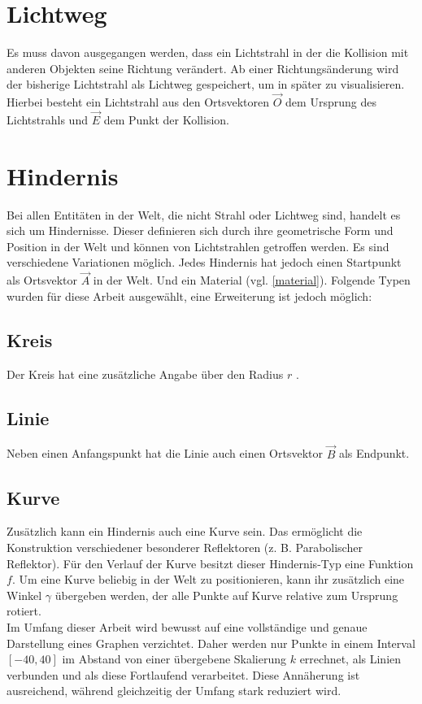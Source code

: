 \section{Lichtweg}
Es muss davon ausgegangen werden, dass ein Lichtstrahl in der 
die Kollision mit anderen Objekten seine Richtung verändert. 
Ab einer Richtungsänderung wird der bisherige Lichtstrahl als Lichtweg  
gespeichert, um in später zu visualisieren.
Hierbei besteht ein Lichtstrahl aus den Ortsvektoren $ \vec{O} $  dem 
Ursprung des Lichtstrahls und $ \vec{E} $  dem Punkt der Kollision.

\section{Hindernis}
Bei allen Entitäten in der Welt, die nicht Strahl oder Lichtweg sind, 
handelt es sich um Hindernisse. 
Dieser definieren sich durch ihre geometrische Form und Position in der Welt 
und können von Lichtstrahlen getroffen werden.
Es sind verschiedene Variationen möglich. Jedes Hindernis  
hat jedoch einen Startpunkt als Ortsvektor $ \vec{A} $  in der Welt. 
Und ein Material  (vgl. \ref{material}). 
Folgende Typen wurden für diese Arbeit ausgewählt, eine Erweiterung ist jedoch möglich: 

\subsection{Kreis}
Der Kreis  hat eine zusätzliche Angabe über den Radius $ r $ .

\subsection{Linie}
Neben einen Anfangspunkt hat die Linie  auch einen Ortsvektor $ \vec{B} $ als Endpunkt. 

\subsection{Kurve}
Zusätzlich kann ein Hindernis auch eine Kurve  sein. 
Das ermöglicht die Konstruktion verschiedener besonderer Reflektoren (z. B. Parabolischer Reflektor).
Für den Verlauf der Kurve besitzt dieser Hindernis-Typ eine Funktion $ f $. 
Um eine Kurve beliebig in der Welt zu positionieren, kann ihr zusätzlich eine Winkel $ \gamma $  übergeben werden, 
der alle Punkte auf Kurve relative zum Ursprung rotiert. \\
Im Umfang dieser Arbeit wird bewusst auf eine vollständige und genaue Darstellung eines Graphen verzichtet. 
Daher werden nur Punkte in einem Interval $ [-40, 40] $ im Abstand von einer übergebene Skalierung $ k $  errechnet, 
als Linien verbunden und als diese Fortlaufend verarbeitet. 
Diese Annäherung ist ausreichend, während gleichzeitig der Umfang stark reduziert wird.


